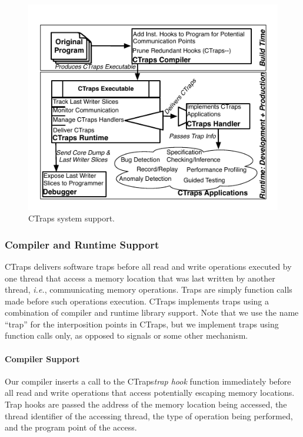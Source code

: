 \documentclass[preprint,9pt]{sigplanconf}
\newcommand{\ctraps}{CTraps\xspace}
\begin{document}
\begin{figure}[htb]
\centering
\includegraphics[width=.90\columnwidth]{figs/SystemDiagram.pdf}
\caption{\label{fig:systemdiagram}CTraps system support.}
\end{figure}



\subsubsection{Compiler and Runtime Support} 

\ctraps delivers software traps before all read and write operations executed
by one thread that access a memory location that was last written by another
thread, {\em i.e.}, communicating memory operations.  Traps are simply function
calls made before such operations execution.  \ctraps implements traps using a
combination of compiler and runtime library support.  Note that we use the name
``trap'' for the interposition points in \ctraps, but we implement traps using 
function calls only, as opposed to signals or some other mechanism. 

\paragraph{Compiler Support}
Our compiler inserts a call to the \ctraps {\em trap hook} function immediately
before all read and write operations that access potentially escaping memory
locations.  Trap hooks are passed the address of the memory location being
accessed, the thread identifier of the accessing thread, the type of operation
being performed, and the program point of the access.  
\end{document}
